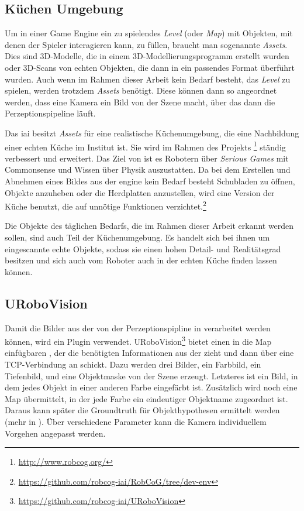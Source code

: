 \subsection{Küchen Umgebung}
\label{subsec:kitchenenvironment}
Um in einer Game Engine ein zu spielendes \textit{Level} (oder \textit{Map}) mit Objekten, mit denen der Spieler interagieren kann, zu füllen, braucht man sogenannte \textit{Assets}. Dies sind 3D-Modelle, die in einem 3D-Modellierungsprogramm erstellt wurden oder 3D-Scans von echten Objekten, die dann in ein passendes Format überführt wurden. Auch wenn im Rahmen dieser Arbeit kein Bedarf besteht, das \textit{Level} zu spielen, werden trotzdem \textit{Assets} benötigt. Diese können dann so angeordnet werden, dass eine Kamera ein Bild von der Szene macht, über das dann die Perzeptionspipeline läuft. \par
Das \gls{iai} besitzt \textit{Assets} für eine realistische Küchenumgebung, die eine Nachbildung einer echten Küche im Institut ist. Sie wird im Rahmen des Projekts \robcog\footnote{\url{http://www.robcog.org/}} ständig verbessert und erweitert. Das Ziel von \robcog ist es Robotern über \textit{Serious Games} mit Commonsense und Wissen über Physik auszustatten. Da bei dem Erstellen und Abnehmen eines Bildes aus der \acrshort{engine} kein Bedarf besteht Schubladen zu öffnen, Objekte anzuheben oder die Herdplatten anzustellen, wird eine Version der Küche benutzt, die auf unnötige Funktionen verzichtet.\footnote{\url{https://github.com/robcog-iai/RobCoG/tree/dev-env}} \par
Die Objekte des täglichen Bedarfs, die im Rahmen dieser Arbeit erkannt werden sollen, sind auch Teil der Küchenumgebung. Es handelt sich bei ihnen um eingescannte echte Objekte, sodass sie einen hohen Detail- und Realitätsgrad besitzen und sich auch vom Roboter auch in der echten Küche finden lassen können.
 
\subsection{URoboVision}
\label{subsec:urobovision}
Damit die Bilder aus der \unreal von der Perzeptionspipline in \robosherlock verarbeitet werden können, wird ein \unreal Plugin verwendet. URoboVision\footnote{\url{https://github.com/robcog-iai/URoboVision}} bietet einen in die Map einfügbaren , der die benötigten Informationen aus der \unreal zieht und dann über eine TCP-Verbindung an \robosherlock schickt.  Dazu werden drei Bilder, ein Farbbild, ein Tiefenbild, und eine Objektmaske von der Szene erzeugt. Letzteres ist ein Bild, in dem jedes Objekt in einer anderen Farbe eingefärbt ist. Zusätzlich wird noch eine Map übermittelt, in der jede Farbe ein eindeutiger Objektname zugeordnet ist. Daraus kann später die Groundtruth für Objekthypothesen  ermittelt werden (mehr in ). Über verschiedene Parameter kann die Kamera individuellem Vorgehen angepasst werden. \par 


